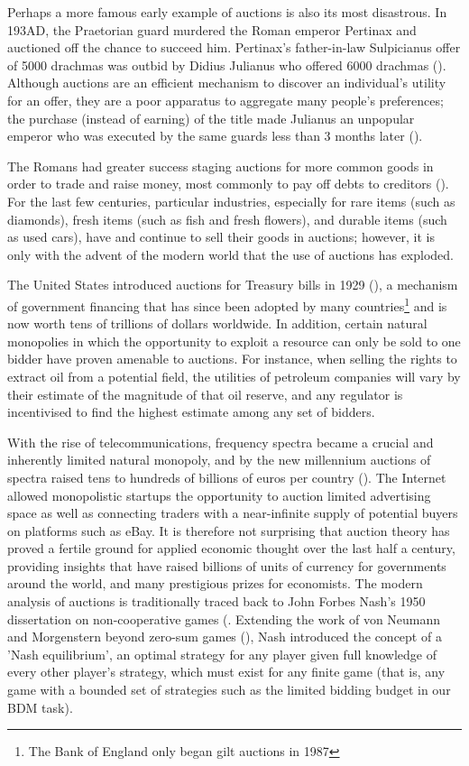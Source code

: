 Perhaps a more famous early example of auctions is also its most disastrous. In 193AD, the Praetorian guard murdered the Roman emperor Pertinax and auctioned off the chance to succeed him. Pertinax's father-in-law Sulpicianus offer of 5000 drachmas was outbid by Didius Julianus who offered 6000 drachmas (\cite{gibbonHistoryDeclineFall1776}). Although auctions are an efficient mechanism to discover an individual’s utility for an offer, they are a poor apparatus to aggregate many people's preferences; the purchase (instead of earning) of the title made Julianus an unpopular emperor who was executed by the same guards less than 3 months later (\cite{dioCassiusDioRoman}).

The Romans had greater success staging auctions for more common goods in order to trade and raise money, most commonly to pay off debts to creditors (\cite{garciamorcilloStagingPowerAuthority2008}).  For the last few centuries, particular industries, especially for rare items (such as diamonds), fresh items (such as fish and fresh flowers), and durable items (such as used cars), have and continue to sell their goods in auctions; however, it is only with the advent of the modern world that the use of auctions has exploded.

The United States introduced auctions for Treasury bills in 1929 (\cite{garbadeWhyUSTreasury2008}), a mechanism of government financing that has since been adopted by many countries\footnote{The Bank of England only began gilt auctions in 1987} and is now worth tens of trillions of dollars worldwide. In addition, certain natural monopolies in which the opportunity to exploit a resource can only be sold to one bidder have proven amenable to auctions. For instance, when selling the rights to extract oil from a potential field, the utilities of petroleum companies will vary by their estimate of the magnitude of that oil reserve, and any regulator is incentivised to find the highest estimate among any set of bidders.

With the rise of telecommunications, frequency spectra became a crucial and inherently limited natural monopoly, and by the new millennium auctions of spectra raised tens to hundreds of billions of euros per country (\cite{klempererWhatReallyMatters2002}). The Internet allowed monopolistic startups the opportunity to auction limited advertising space as well as connecting traders with a near-infinite supply of potential buyers on platforms such as eBay.
It is therefore not surprising that auction theory has proved a fertile ground for applied economic thought over the last half a century, providing insights that have raised billions of units of currency for governments around the world, and many prestigious prizes for economists. The modern analysis of auctions is traditionally traced back to John Forbes Nash's 1950 dissertation on non-cooperative games (\cite{nashNonCooperativeGames1951}. Extending the work of von Neumann and Morgenstern beyond zero-sum games (\cite{vonNeumann1944}), Nash introduced the concept of a 'Nash equilibrium', an optimal strategy for any player given full knowledge of every other player's strategy, which must exist for any finite game (that is, any game with a bounded set of strategies such as the limited bidding budget in our BDM task).


